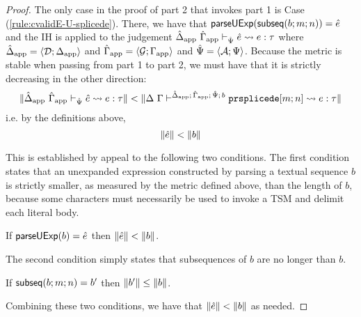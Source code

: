 \begin{proof}
The only case in the proof of part 2 that invokes part 1 is Case (\ref{rule:cvalidE-U-splicede}). There, we have that $\mathsf{parseUExp}(\mathsf{subseq}(b; m; n))={\hat e}$ and the IH is applied to the judgement $\hat{\Delta}_\text{app}~\hat{\Gamma}_\text{app} \vdash_{\hat{\Psi}} {\hat e} \leadsto e : \tau$ where $\hat{\Delta}_\text{app}=\langle \mathcal{D}; \Delta_\text{app} \rangle$ and $\hat{\Gamma}_\text{app}=\langle \mathcal{G}; \Gamma_\text{app} \rangle$ and $\hat{\Psi}=\langle \mathcal{A}; \Psi \rangle$. Because the metric is stable when passing from part 1 to part 2, we must have that it is strictly decreasing in the other direction:
\[\Vert \hat{\Delta}_\text{app}~\hat{\Gamma}_\text{app} \vdash_{\hat{\Psi}} {\hat e} \leadsto e : \tau \Vert < \Vert \Delta~\Gamma\vdash^{\hat{\Delta}_\text{app};\,\hat{\Gamma}_\text{app};\,\hat{\Psi};\,b} \texttt{prsplicede}[m; n] \leadsto e : \tau \Vert\]
i.e. by the definitions above, 
\[\Vert {\hat e} \Vert < \Vert b \Vert\]

This is established by appeal to the following two conditions. The first condition states that an unexpanded expression constructed by parsing a textual sequence $b$ is strictly smaller, as measured by the metric defined above, than the length of $b$, because some characters must necessarily be used to invoke a TSM and delimit each literal body.
\begingroup
\def\thetheorem{\ref{condition:body-parsing}}
\begin{condition} If $\mathsf{parseUExp}(b)={\hat e}$ then $\Vert {\hat e} \Vert < \Vert b \Vert$.\end{condition}
\endgroup
The second condition simply states that subsequences of $b$ are no longer than $b$.
\begingroup
\def\thetheorem{\ref{condition:body-subsequences}}
\begin{condition} If $\mathsf{subseq}(b; m; n)=b'$ then $\Vert b' \Vert \leq \Vert b \Vert$. \end{condition}
\endgroup

Combining these two conditions, we have that $\Vert {\hat e} \Vert < \Vert b \Vert$ as needed.
\end{proof}
